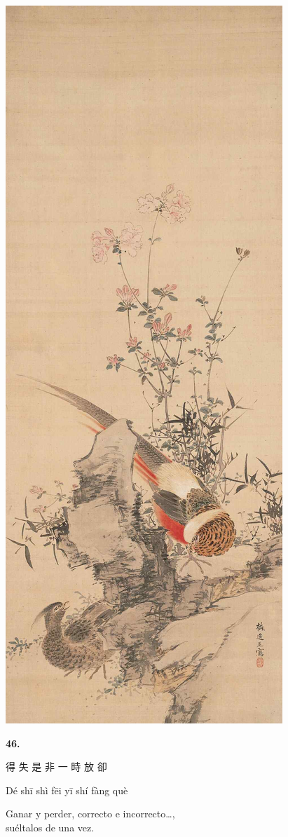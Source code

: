 \documentclass[
  a5paperpaper,
]{article}
\begin{document}
\hypertarget{01}{}
\includegraphics{../img/image10.jpg}

\begin{verseblock}

\newpage

\begin{center}\textbf{46.}\end{center}

得 失 是 非 一 時 放 卻

Dé shī shì fēi yī shí fàng què

Ganar y perder, correcto e incorrecto\ldots,\\
suéltalos de una vez.

\end{verseblock}
\end{document}

